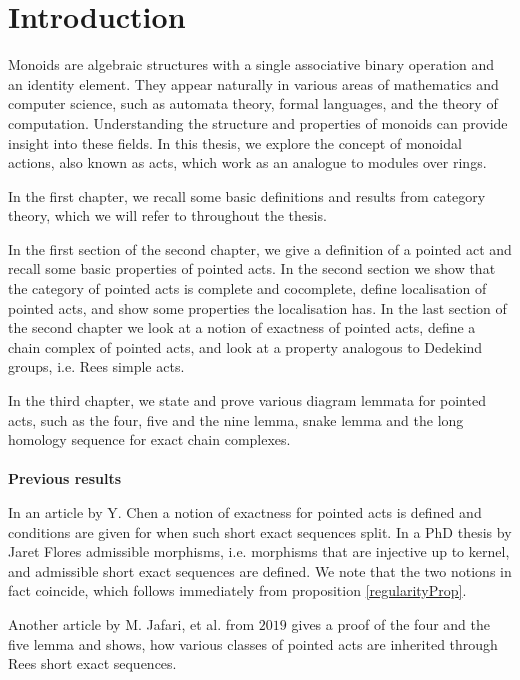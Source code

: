 \chapter*{Introduction}

Monoids are algebraic structures with a single associative binary operation and an identity element. 
They appear naturally in various areas of mathematics and computer science, such as automata theory, formal languages, and the theory of computation. 
Understanding the structure and properties of monoids can provide insight into these fields.
In this thesis, we explore the concept of monoidal actions, also known as acts, which work as an analogue to modules over rings.\par 

In the first chapter, we recall some basic definitions and results from category theory, which we will refer to throughout the thesis.\par  
In the first section of the second chapter, we give a definition of a pointed act and recall some basic properties of pointed acts. In the second section we show that the category of pointed acts is complete and 
cocomplete, define localisation of pointed acts, and show some properties the localisation has. In the last section of the second chapter we look at a 
notion of exactness of pointed acts, define a chain complex of pointed acts, and look at a property analogous to Dedekind groups, i.e. Rees simple acts.\par 
In the third chapter, we state and prove various diagram lemmata for pointed acts, such as the four, five and the nine lemma, snake lemma and the long homology sequence for
exact chain complexes.\\ \\
\textbf{Previous results}\par 
    In an article by Y. Chen \cite{Chen02} a notion of exactness for pointed acts is defined and conditions are given for when such 
    short exact sequences split. In a PhD thesis by Jaret Flores \cite{Flores15} admissible morphisms, i.e. morphisms that are injective up to kernel,
    and admissible short exact sequences are defined. We note that the two notions in fact coincide, which follows immediately from proposition \ref{regularityProp}.\par 
    Another article by M. Jafari, et al. \cite{Jafari19} from $2019$ gives a proof of the four and the five lemma and shows, how various classes of 
    pointed acts are inherited through Rees short exact sequences.